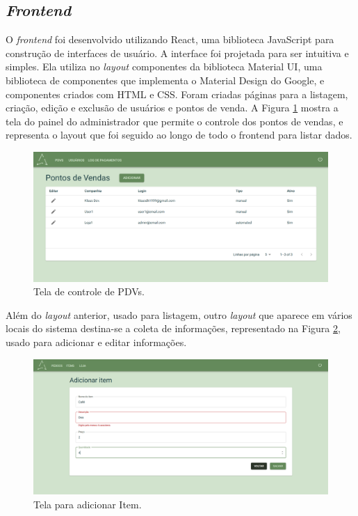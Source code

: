 \subsection{\textit{Frontend}}

O \textit{frontend} foi desenvolvido utilizando React, uma biblioteca JavaScript para construção de interfaces de usuário. A interface foi projetada para ser intuitiva e simples. Ela utiliza no \textit{layout} componentes da biblioteca Material UI, uma biblioteca de componentes que implementa o Material Design do Google, e componentes criados com HTML e CSS. Foram criadas páginas para a listagem, criação, edição e exclusão de usuários e pontos de venda. A Figura \ref{fig:pdvs} mostra a tela do painel do administrador que permite o controle dos pontos de vendas, e representa o layout que foi seguido ao longo de todo o frontend para listar dados.

\begin{figure}
	\caption{\label{fig:pdvs}Tela de controle de PDVs.}
	\begin{center}
		\includegraphics[width=\textwidth]{figuras/tela pontos de vendas.png}
	\end{center}
\end{figure}

Além do \textit{layout} anterior, usado para listagem, outro \textit{layout} que aparece em vários locais do sistema destina-se a coleta de informações, representado na Figura \ref{fig:crud}, usado para adicionar e editar informações. 

\begin{figure}
	\caption{\label{fig:crud}Tela para adicionar Item.}
	\begin{center}
		\includegraphics[width=\textwidth]{figuras/adicionar.png}
	\end{center}
\end{figure}

